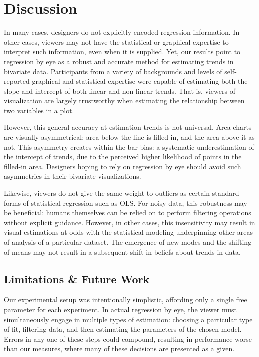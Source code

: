 \documentclass{sigchi}
\begin{document}
\section{Discussion}

In many cases, designers do not explicitly encoded regression information. In other cases, viewers may not have the statistical or graphical expertise to interpret such information, even when it is supplied. Yet, our results point to regression by eye as a robust and accurate method for estimating trends in bivariate data. Participants from a variety of backgrounds and levels of self-reported graphical and statistical expertise were capable of estimating both the slope and intercept of both linear and non-linear trends. That is, viewers of visualization are largely trustworthy when estimating the relationship between two variables in a plot.

However, this general accuracy at estimation trends is not universal. Area charts are visually asymmetrical: area below the line is filled in, and the area above it as not. This asymmetry creates within the bar bias: a systematic underestimation of the intercept of trends, due to the perceived higher likelihood of points in the filled-in area. Designers hoping to rely on regression by eye should avoid such asymmetries in their bivariate visualizations.

Likewise, viewers do not give the same weight to outliers as certain standard forms of statistical regression such as OLS. For noisy data, this robustness may be beneficial: humans themselves can be relied on to perform filtering operations without explicit guidance. However, in other cases, this insensitivity may result in visual estimations at odds with the statistical modeling underpinning other areas of analysis of a particular dataset. The emergence of new modes and the shifting of means may not result in a subsequent shift in beliefs about trends in data.

\subsection{Limitations \& Future Work}

Our experimental setup was intentionally simplistic, affording only a single free parameter for each experiment. In actual regression by eye, the viewer must simultaneously engage in multiple types of estimation: choosing a particular type of fit, filtering data, and then estimating the parameters of the chosen model. Errors in any one of these steps could compound, resulting in performance worse than our measures, where many of these decisions are presented as a given.
\end{document}
